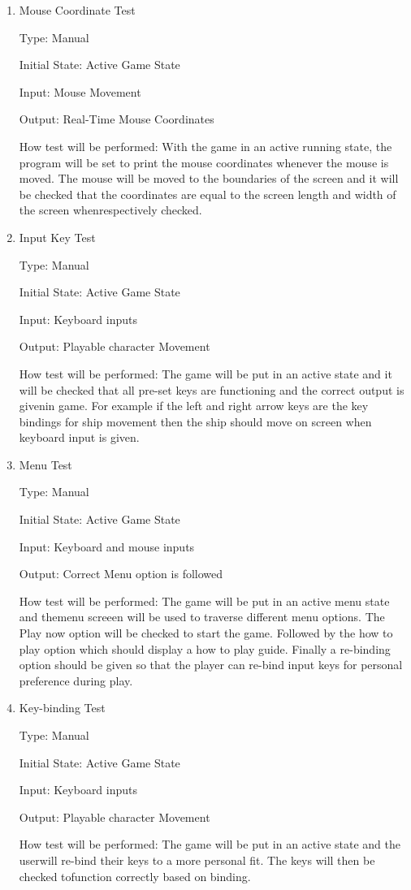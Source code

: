 \documentclass[12pt, titlepage]{article}
\begin{document}
\begin{enumerate}

\item{Mouse Coordinate Test\\}

Type: Manual 
					
Initial State: Active Game State 
					
Input: Mouse Movement 
					
Output: Real-Time Mouse Coordinates 
					
How test will be performed: With the game in an active running state, the
program will be set to print the mouse coordinates whenever the mouse is moved.
The mouse will be moved to the boundaries of the screen and it will be checked
that the coordinates are equal to the screen length and width of the screen
whenrespectively checked.
					
\item{Input Key Test\\}

Type: Manual 
					
Initial State: Active Game State 
					
Input: Keyboard inputs
					
Output: Playable character Movement
					
How test will be performed: The game will be put in an active state and it will
be checked that all pre-set keys are functioning and the correct output is
givenin game. For example if the left and right arrow keys are the key bindings
for
ship movement then the ship should move on screen when keyboard input is given.


\item{Menu Test\\}

Type: Manual
					
Initial State: Active Game State
					
Input: Keyboard and mouse inputs 
					
Output: Correct Menu option is followed 
					
How test will be performed: The game will be put in an active menu state and
themenu screeen will be used to traverse different menu options. The Play now
option will be checked to start the game. Followed by the how to play option
which should display a how to play guide. Finally a re-binding option should be
given so that the player can re-bind input keys for personal preference during
play.


\item{Key-binding Test\\}

Type: Manual

Initial State: Active Game State 

Input: Keyboard inputs

Output: Playable character Movement

How test will be performed: The game will be put in an active state and the
userwill re-bind their keys to a more personal fit. The keys will then be
checked tofunction correctly based on binding.

\end{enumerate}
\end{document}
